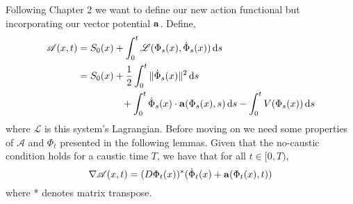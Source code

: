 \documentclass[a4paper,12pt,draft]{report}
\theoremstyle{remark}
\theoremstyle{definition}
\begin{document}
Following Chapter 2 we want to define our new action functional but incorporating our vector potential $\bold{a}$.  Define,
\begin{align}
\mathscr{A}(x, t) & = S_0(x) + \int_0^t\mathscr{L}(\Phi_s(x), \dot{\Phi}_s(x))\,\mathrm{d}s\nonumber\\
& = S_0(x) + \frac{1}{2}\int_0^t\|\dot{\Phi}_s(x)\|^2\,\mathrm{d}s\nonumber\\
& \hspace{1.6cm} + \int_0^t\dot{\Phi}_s(x)\cdot\bold{a}(\Phi_s(x), s)\,\mathrm{d}s - \int_0^tV(\Phi_s(x))\,\mathrm{d}s\nonumber
\end{align}
where $\mathscr{L}$ is this system's Lagrangian.  Before moving on we need some properties of $\mathscr{A}$ and $\Phi_t$ presented in the following lemmas.
\lemma
{
Given that the no-caustic condition holds for a caustic time $T$, we have that for all $t \in [0, T)$,
$$
\nabla\mathscr{A}(x, t) = (D\Phi_t(x))^*(\dot{\Phi}_t(x) + \bold{a}(\Phi_t(x), t))
$$
where * denotes matrix transpose.
}
\proof
\end{document}
